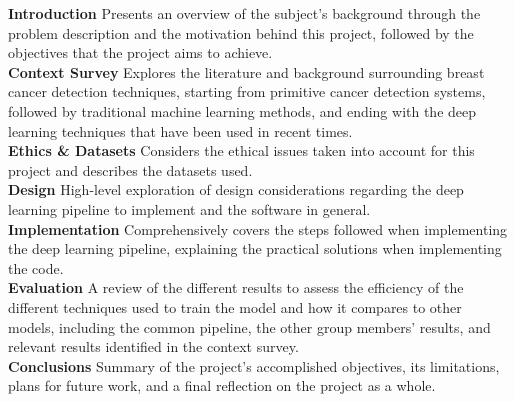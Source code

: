 \tab \textbf{Introduction} \space 
Presents an overview of the subject's background through the problem description and the motivation behind this project, followed by the objectives that the project aims to achieve.\\

\textbf{Context Survey} \space
Explores the literature and background surrounding breast cancer detection techniques, starting from primitive cancer detection systems, followed by traditional machine learning methods, and ending with the deep learning techniques that have been used in recent times.\\

\textbf{Ethics \& Datasets} \space
Considers the ethical issues taken into account for this project and describes the datasets used.\\

\textbf{Design} \space
High-level exploration of design considerations regarding the deep learning pipeline to implement and the software in general.\\

\textbf{Implementation} \space
Comprehensively covers the steps followed when implementing the deep learning pipeline, explaining the practical solutions when implementing the code.\\ %

\textbf{Evaluation} \space
A review of the different results to assess the efficiency of the different techniques used to train the model and how it compares to other models, including the common pipeline, the other group members' results, and relevant results identified in the context survey.\\

\textbf{Conclusions} \space
Summary of the project's accomplished objectives, its limitations, plans for future work, and a ﬁnal reflection on the project as a whole.